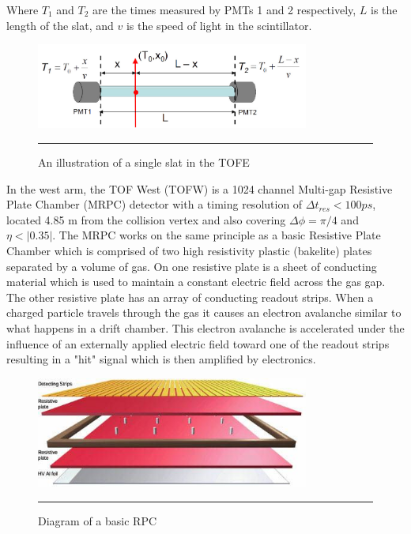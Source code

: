 Where $T_1$ and $T_{2}$ are the times measured by PMTs 1 and 2 respectively, $L$ is the length of the slat, and $v$ is the speed of light in the scintillator.

\begin{figure}[htbp]
  \centering
    \includegraphics[width=0.8\textwidth]{Figures/TOFEcartoon.jpg}
    \rule{35em}{0.5pt}
  \caption[An illustration of a single slat in the TOFE]{An illustration of a single slat in the TOFE}
  \label{fig:TOFEcartoon}
\end{figure}

In the west arm, the TOF West (TOFW) is a 1024 channel Multi-gap Resistive Plate Chamber (MRPC) detector with a timing resolution of $\Delta t_{res} < 100 ps$, located 4.85 m from the collision vertex and also covering $\Delta\phi = \pi / 4$ and $\eta < |0.35|$. The MRPC works on the same principle as a basic Resistive Plate Chamber which is comprised of two high resistivity plastic (bakelite) plates separated by a volume of gas. On one resistive plate is a sheet of conducting material which is used to maintain a constant electric field across the gas gap. The other resistive plate has an array of conducting readout strips. When a charged particle travels through the gas it causes an electron avalanche similar to what happens in a drift chamber. This electron avalanche is accelerated under the influence of an externally applied electric field toward one of the readout strips resulting in a "hit" signal which is then amplified by electronics. 

\begin{figure}[h]
  \centering
    \includegraphics[width=0.8\textwidth]{Figures/RPClayers.jpg}
    \rule{35em}{0.5pt}
  \caption[Diagram of a basic RPC]{Diagram of a basic RPC \citep{CMSRPC}}
  \label{fig:RPCbasic}
\end{figure}


